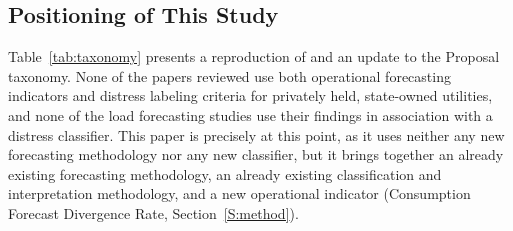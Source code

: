 \documentclass[final,1p,times]{elsarticle}
\begin{document}
\subsection{Positioning of This Study}

Table~\ref{tab:taxonomy} presents a reproduction of and an update to the Proposal taxonomy. None of the papers reviewed use both operational forecasting indicators and distress labeling criteria for privately held, state-owned utilities, and none of the load forecasting studies use their findings in association with a distress classifier. This paper is precisely at this point, as it uses neither any new forecasting methodology nor any new classifier, but it brings together an already existing forecasting methodology, an already existing classification and interpretation methodology, and a new operational indicator (Consumption Forecast Divergence Rate, Section~\ref{S:method}).
\end{document}
